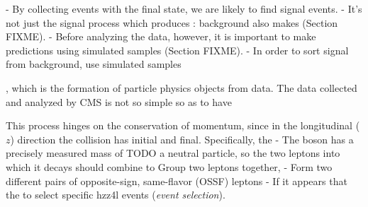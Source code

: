 - By collecting events with the \fourl final state, we are likely to find signal events.
    - It's not just the signal process which produces \fourl: background also makes \fourl (Section FIXME).
- Before analyzing the data, however, it is important to make predictions using simulated samples (Section FIXME).
- In order to sort signal from background, use simulated samples 



, which is the formation of particle physics objects from data.
The data collected and analyzed by CMS is not so simple so as to have \htozz


This process hinges on the conservation of momentum, since in the longitudinal ($z$) direction the \pp collision has initial and final.
Specifically, the 
    - The \PZ boson has a precisely measured mass of TODO a neutral particle, so the two leptons into which it decays should combine to Group two leptons together, 
    - Form two different pairs of opposite-sign, same-flavor (OSSF) leptons
    - If it appears that the to select specific hzz4l events (\emph{event selection}).

